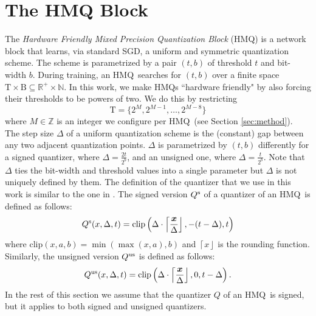 \documentclass{article}
\newcommand{\clip}[3]{\mathrm{clip}\left(#1,#2,#3\right)}
\newcommand{\round}[1]{\left\lceil#1\right\rfloor}
\newcommand{\vectorsym}[1]{\bm{#1}}
\newcommand{\bitset}{\mathrm{B}}
\newcommand{\threshset}{\mathrm{T}}
\newcommand{\qb}{HMQ}
\begin{document}
 \section{The HMQ Block}\label{sec:quant_block}
The \textit{Hardware Friendly Mixed Precision Quantization Block} (\qb) is a network block that learns, via standard SGD, a uniform and symmetric quantization scheme.
The scheme is parametrized by a pair $(t, b)$ of threshold $t$ and bit-width $b$.
During training, an \qb\ searches for $(t, b)$ over a finite space $\threshset\times \bitset\subseteq\mathbb{R}^+\times \mathbb{N}$.
In this work, we make \qb s ``hardware friendly" by also forcing their thresholds to be powers of two. 
We do this by restricting 
\begin{equation}\label{equ:threshold_set}
\threshset=\{2^M, 2^{M-1}, \dots, 2^{M-8}\}
\end{equation}
where $M\in\mathbb{Z}$ is an integer we configure per \qb\ (see Section \ref{sec:method}).\\

The step size $\Delta$ of a uniform quantization scheme is the (constant) gap between any two adjacent quantization points.
$\Delta$ is parametrized by $(t, b)$ differently for a signed quantizer, where $\Delta = \frac{2t}{2^{b}}$, and an unsigned one, where $\Delta =\frac{t}{2^{b}}$. 
Note that $\Delta$ ties the bit-width and threshold values into a single parameter but $\Delta$ is not uniquely defined by them. 
The definition of the quantizer that we use in this work is similar to the one in \cite{jain2019trained}.
The signed version $Q^{\rm{s}}$ of a quantizer of an \qb\ is defined as follows:
\begin{equation}\label{equ:signed_quantizer}
Q^{\rm{s}}(x, \Delta, t)=\clip{\Delta\cdot\round{\frac{\vectorsym{x}}{\Delta}}}{-(t-\Delta)}{t}
\end{equation}
where $\clip{x}{a}{b}=\min(\max(x,a), b)$ and $\round{x}$ is the rounding function.
Similarly, the unsigned version $Q^{\rm{us}}$ is defined as follows:
\begin{equation}\label{equ:unsigned_quantizer}
Q^{\rm{us}}(x,\Delta,t)=\clip{\Delta\cdot\round{\frac{\vectorsym{x}}{\Delta}}}{0}{t-\Delta}.
\end{equation}
In the rest of this section we assume that the quantizer $Q$ of an \qb\ is signed, but it applies to both signed and unsigned quantizers.\\
\end{document}
